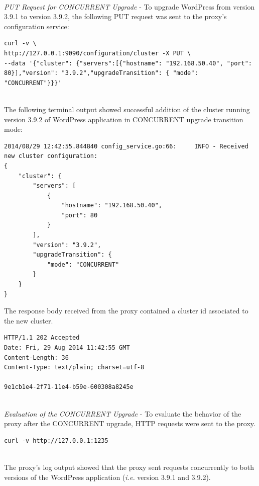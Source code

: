 \documentclass[a4paper,11pt,twoside]{report}
\begin{document}
\noindent\\
\textit{PUT Request for CONCURRENT Upgrade} - To upgrade WordPress from version 3.9.1 to version 3.9.2, the following PUT request was sent to the proxy's configuration service: \smallskip

\begin{lstlisting}[language=terminal]
curl -v \
http://127.0.0.1:9090/configuration/cluster -X PUT \
--data '{"cluster": {"servers":[{"hostname": "192.168.50.40", "port": 80}],"version": "3.9.2","upgradeTransition": { "mode": "CONCURRENT"}}}'
\end{lstlisting}  

\noindent\\
The following terminal output showed successful addition of the cluster running version 3.9.2 of WordPress application in CONCURRENT upgrade transition mode:\smallskip

\begin{lstlisting}[language=terminal]
2014/08/29 12:42:55.844840 config_service.go:66:     INFO - Received new cluster configuration:
{
    "cluster": {
        "servers": [
            {
                "hostname": "192.168.50.40", 
                "port": 80
            }
        ], 
        "version": "3.9.2", 
        "upgradeTransition": {
            "mode": "CONCURRENT"
        }
    }
} 
\end{lstlisting} 

\noindent
The response body received from the proxy contained a cluster id associated to the new cluster.\smallskip

\begin{lstlisting}[language=terminal]
HTTP/1.1 202 Accepted
Date: Fri, 29 Aug 2014 11:42:55 GMT
Content-Length: 36
Content-Type: text/plain; charset=utf-8

9e1cb1e4-2f71-11e4-b59e-600308a8245e
\end{lstlisting} 

\noindent\\
\textit{Evaluation of the CONCURRENT Upgrade} - To evaluate the behavior of the proxy after the CONCURRENT upgrade, HTTP requests were sent to the proxy. \smallskip

\begin{lstlisting}[language=terminal]
curl -v http://127.0.0.1:1235
\end{lstlisting}

\noindent\\ 
The proxy's log output showed that the proxy sent requests concurrently to both versions of the WordPress application (\textit{i.e.} version 3.9.1 and 3.9.2). \smallskip 
\end{document}
